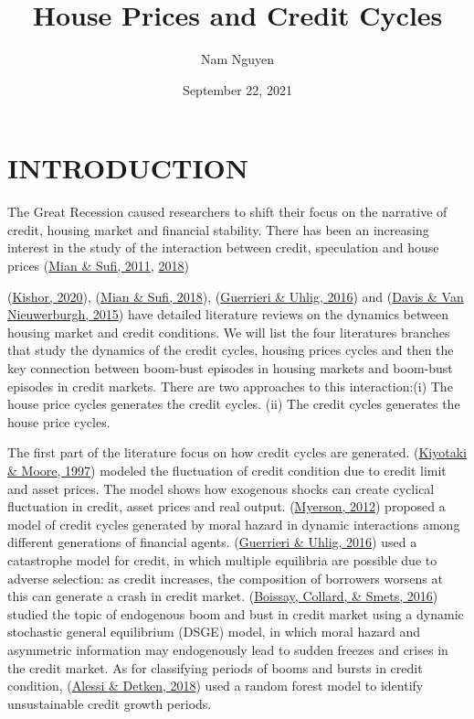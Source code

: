 \documentclass[
  12pt,
]{article}
\title{House Prices and Credit Cycles}
\author{Nam Nguyen}
\date{September 22, 2021}
\begin{document}
\maketitle

\hypertarget{introduction}{%
\section{INTRODUCTION}\label{introduction}}

The Great Recession caused researchers to shift their focus on the narrative of credit, housing market and financial stability. There has been an increasing interest in the study of the interaction between credit, speculation and house prices (\protect\hyperlink{ref-mian_house_2011}{Mian \& Sufi, 2011}, \protect\hyperlink{ref-mian_credit_2018}{2018})

(\protect\hyperlink{ref-kishor_forecasting_2020}{Kishor, 2020}), (\protect\hyperlink{ref-mian_credit_2018}{Mian \& Sufi, 2018}), (\protect\hyperlink{ref-guerrieri_housing_2016}{Guerrieri \& Uhlig, 2016}) and (\protect\hyperlink{ref-davis_housing_2015}{Davis \& Van Nieuwerburgh, 2015}) have detailed literature reviews on the dynamics between housing market and credit conditions. We will list the four literatures branches that study the dynamics of the credit cycles, housing prices cycles and then the key connection between boom-bust episodes in housing markets and boom-bust episodes in credit markets. There are two approaches to this interaction:(i) The house price cycles generates the credit cycles. (ii) The credit cycles generates the house price cycles.

The first part of the literature focus on how credit cycles are generated. (\protect\hyperlink{ref-kiyotaki_credit_1997}{Kiyotaki \& Moore, 1997}) modeled the fluctuation of credit condition due to credit limit and asset prices. The model shows how exogenous shocks can create cyclical fluctuation in credit, asset prices and real output. (\protect\hyperlink{ref-myerson_model_2012}{Myerson, 2012}) proposed a model of credit cycles generated by moral hazard in dynamic interactions among different generations of financial agents. (\protect\hyperlink{ref-guerrieri_housing_2016}{Guerrieri \& Uhlig, 2016}) used a catastrophe model for credit, in which multiple equilibria are possible due to adverse selection: as credit increases, the composition of borrowers worsens at this can generate a crash in credit market. (\protect\hyperlink{ref-boissay_booms_2016}{Boissay, Collard, \& Smets, 2016}) studied the topic of endogenous boom and bust in credit market using a dynamic stochastic general equilibrium (DSGE) model, in which moral hazard and asymmetric information may endogenously lead to sudden freezes and crises in the credit market. As for classifying periods of booms and bursts in credit condition, (\protect\hyperlink{ref-alessi_identifying_2018}{Alessi \& Detken, 2018}) used a random forest model to identify unsustainable credit growth periods.
\end{document}
